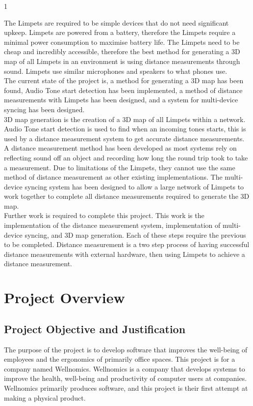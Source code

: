 1\documentclass{article}
\begin{document}
The Limpets are required to be simple devices that do not need significant upkeep. Limpets are powered from a battery, therefore the Limpets require a minimal power consumption to maximise battery life. The Limpets need to be cheap and incredibly accessible, therefore the best method for generating a 3D map of all Limpets in an environment is using distance measurements through sound. Limpets use similar microphones and speakers to what phones use.\\

The current state of the project is, a method for generating a 3D map has been found, Audio Tone start detection has been implemented, a method of distance measurements with Limpets has been designed, and a system for multi-device syncing has been designed.\\

3D map generation is the creation of a 3D map of all Limpets within a network. Audio Tone start detection is used to find when an incoming tones starts, this is used by a distance measurement system to get accurate distance measurements. A distance measurement method has been developed as most systems rely on reflecting sound off an object and recording how long the round trip took to take a measurement. Due to limitations of the Limpets, they cannot use the same method of distance measurement as other existing implementations. The multi-device syncing system has been designed to allow a large network of Limpets to work together to complete all distance measurements required to generate the 3D map.\\

Further work is required to complete this project. This work is the implementation of the distance measurement system, implementation of multi-device syncing, and 3D map generation. Each of these steps require the previous to be completed. Distance measurement is a two step process of having successful distance measurements with external hardware, then using Limpets to achieve a distance measurement.


\pagebreak
\tableofcontents
\pagebreak

\section{Project Overview}
\subsection{Project Objective and Justification}
The purpose of the project is to develop software that improves the well-being of employees and the ergonomics of primarily office spaces. This project is for a company named Wellnomics. Wellnomics is a company that develops systems to improve the health, well-being and productivity of computer users at companies. Wellnomics primarily produces software, and this project is their first attempt at making a physical product.\\ 
\end{document}
